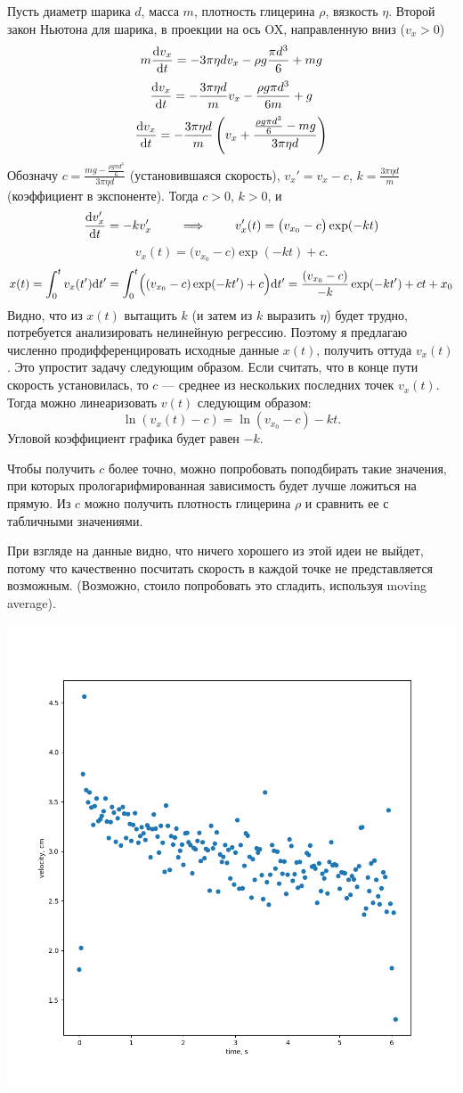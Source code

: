 \documentclass[a4paper, 12pt]{article}
\begin{document}
Пусть диаметр шарика $d$, масса $m$, плотность глицерина $\rho$, вязкость $\eta$.
Второй закон Ньютона для шарика, в проекции на ось OX, направленную вниз ($v_x > 0$)
\[ m \dv{v_x}{t} = -3 \pi \eta d v_x - \rho g \frac{\pi d^3}6 + mg \]
\[ \dv{v_x}{t} = -\frac{3 \pi \eta d}m v_x - \frac{\rho g \pi d^3}{6 m} + g \]
\[ \dv{v_x}{t} = -\frac{3 \pi \eta d}m \left(v_x + \frac{\frac{\rho g \pi d^3}{6} - mg}{3 \pi \eta d}\right) \]
Обозначу $c = \frac{mg - \frac{\rho g \pi d^3}{6}}{3 \pi \eta d}$ (установившаяся скорость), $v_x' = v_x - c$, $k = \frac{3 \pi \eta d}m$ (коэффициент в экспоненте).
Тогда $c > 0$, $k > 0$, и
\[ \dv{v_x'}{t} = -k v_x' \qquad\implies\qquad v_x'(t) = \bigl(v_{x_0} - c\bigr)\exp(-kt) \]
\[ v_x(t) = \bigl(v_{x_0} -  c\bigr)\exp(-kt) + c .\] 
\[
x(t) = \int_{0}^t v_x(t') \dd t' = \int_{0}^t \Bigl((v_{x_0} -  c)\exp(-kt') + c\Bigr) \dd t' =
	   \frac{(v_{x_0} -  c)}{-k}\exp(-kt') + ct + x_0
\]
Видно, что из $x(t)$ вытащить $k$ (и затем из $k$ выразить $\eta$) будет трудно, потребуется анализировать нелинейную регрессию.
Поэтому я предлагаю численно продифференцировать исходные данные $x(t)$, получить оттуда $v_x(t)$.
Это упростит задачу следующим образом.
Если считать, что в конце пути скорость установилась, то $c$ --- среднее из нескольких последних точек $v_x(t)$.
Тогда можно линеаризовать $v(t)$ следующим образом:
\[ \ln( v_x(t) - c ) = \ln(v_{x_0} -  c) - k t .\] 
Угловой коэффициент графика будет равен $-k$.

Чтобы получить $c$ более точно, можно попробовать поподбирать такие значения, при которых прологарифмированная зависимость будет лучше ложиться на прямую.
Из $c$ можно получить плотность глицерина $\rho$ и сравнить ее с табличными значениями.

При взгляде на данные видно, что ничего хорошего из этой идеи не выйдет, потому что качественно посчитать скорость в каждой точке не представляется возможным.
(Возможно, стоило попробовать это сгладить, используя moving average).
\begin{center}
\includegraphics[width=0.6\linewidth]{bad_numericall_differentiation.png}
\end{center}
\end{document}
